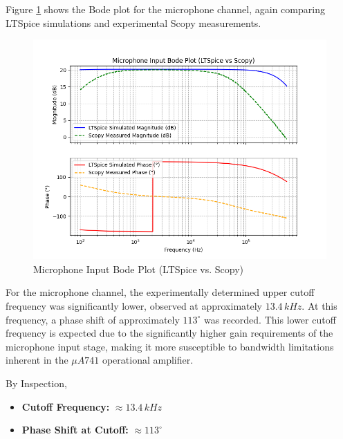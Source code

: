 \documentclass[12pt]{article}
\begin{document}
Figure \ref{fig:mic_bode} shows the Bode plot for the microphone channel, again comparing LTSpice simulations and experimental Scopy measurements.

\begin{figure}[H]
	\centering
	\includegraphics[width=1.0\textwidth]{dp_mic}
	\caption{Microphone Input Bode Plot (LTSpice vs. Scopy)}
	\label{fig:mic_bode}
\end{figure}

For the microphone channel, the experimentally determined upper cutoff frequency
was significantly lower, observed at approximately $13.4\,kHz$. At this
frequency, a phase shift of approximately $113^\circ$ was recorded. This lower cutoff frequency is expected due to the significantly higher gain requirements of the microphone input stage, making it more susceptible to bandwidth limitations inherent in the $\mu A741$ operational amplifier.

By Inspection,
\begin{itemize}
	\item \textbf{Cutoff Frequency:} $\approx 13.4\,kHz$
	\item \textbf{Phase Shift at Cutoff:} $\approx 113^\circ$
\end{itemize}
\end{document}
